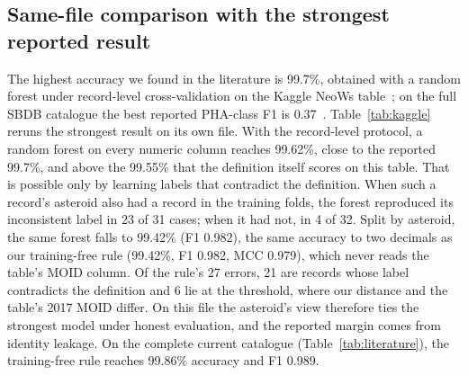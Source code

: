 \documentclass[conference]{IEEEtran}
\begin{document}
\subsection{Same-file comparison with the strongest reported result}
The highest accuracy we found in the literature is 99.7\%, obtained with a random forest under record-level cross-validation on the Kaggle NeoWs table~\cite{chandra2025}; on the full SBDB catalogue the best reported PHA-class F1 is 0.37~\cite{jacques2025}. Table~\ref{tab:kaggle} reruns the strongest result on its own file. With the record-level protocol, a random forest on every numeric column reaches 99.62\%, close to the reported 99.7\%, and above the 99.55\% that the definition itself scores on this table. That is possible only by learning labels that contradict the definition. When such a record's asteroid also had a record in the training folds, the forest reproduced its inconsistent label in 23 of 31 cases; when it had not, in 4 of 32. Split by asteroid, the same forest falls to 99.42\% (F1 0.982), the same accuracy to two decimals as our training-free rule (99.42\%, F1 0.982, MCC 0.979), which never reads the table's MOID column. Of the rule's 27 errors, 21 are records whose label contradicts the definition and 6 lie at the threshold, where our distance and the table's 2017 MOID differ. On this file the asteroid's view therefore ties the strongest model under honest evaluation, and the reported margin comes from identity leakage. On the complete current catalogue (Table~\ref{tab:literature}), the training-free rule reaches 99.86\% accuracy and F1 0.989.


\end{document}
